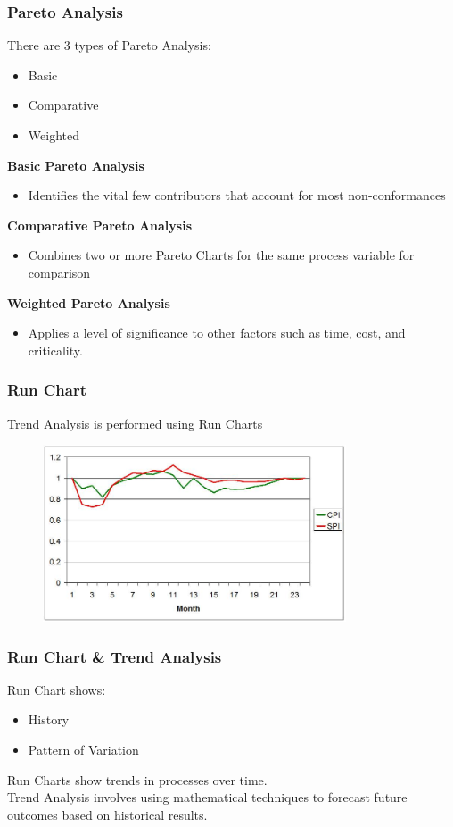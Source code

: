 \begin{frame}
\frametitle{Pareto Analysis}
There are 3 types of Pareto Analysis:
\begin{itemize}
	\item Basic
	\item Comparative
	\item Weighted
\end{itemize}
\textbf{Basic Pareto Analysis}
\begin{itemize}
	\item Identifies the vital few contributors that account for most non-conformances
\end{itemize}
\textbf{Comparative Pareto Analysis}
\begin{itemize}
	\item Combines two or more Pareto Charts for the same process variable for comparison
\end{itemize}
\textbf{Weighted Pareto Analysis}
\begin{itemize}
	\item Applies a level of significance to other factors such as time, cost, and criticality.
\end{itemize}
\end{frame}




\begin{frame}
\frametitle{Run Chart}
Trend Analysis is performed using Run Charts
\begin{figure}
	\centering
		\includegraphics[width = 9cm]{images/runchart.jpg}
	\label{fig:run}
\end{figure}

\end{frame}




\begin{frame}
\frametitle{Run Chart \& Trend Analysis}
Run Chart shows:\\
\begin{itemize}
	\item History 
	\item Pattern of Variation
\end{itemize}
Run Charts show trends in processes over time.\\
Trend Analysis involves using mathematical techniques to forecast future outcomes based on historical results.\\
\end{frame}




